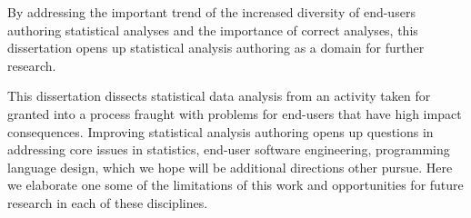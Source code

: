 

By addressing the important trend of the increased diversity of end-users
authoring statistical analyses and the importance of correct analyses, this
dissertation opens up statistical analysis authoring as a domain for further
research. 

This dissertation dissects statistical data analysis from an activity taken for
granted into a process fraught with problems for end-users that have high impact
consequences. Improving statistical analysis authoring opens up questions in
addressing core issues in statistics, end-user software engineering, programming
language design, which we hope will be additional directions other pursue. Here
we elaborate one some of the limitations of this work and opportunities for
future research in each of these disciplines. 

\begin{comment}
As demonstrations of how better programming abstractions and automated reasoning
can enable statistical non-experts to author analyses and improve the quality of
statistical analysis, Tea and Tisane...

Tea and Tisane have demonstrated the benefit of using higher levels of
abstraction focused on conceptual knowledge expression and reasoning. They
primarily orient the question of design...They can serve as building blocks for START HERE

Has this dissertation lost its way? Further re-orienting towards what users *really* want: to understand their domain
Push further in directions this work orients us 
- more support for understanding results, especially when some questions may not be answerable with the data/how it was collected
- knowing how robust the results are --> why not just multiverse everything?
**how do we resolve and come out from under the tyranny of false positive rates fear
\end{comment}

